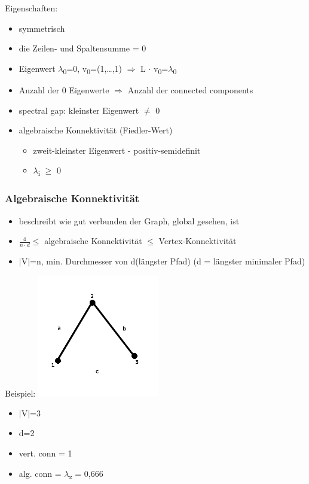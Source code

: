 Eigenschaften:
\begin{itemize}
	\item symmetrisch
	\item die Zeilen- und Spaltensumme = 0
	\item Eigenwert $\lambda$\textsubscript{0}=0, v\textsubscript{0}=(1,\ldots,1) $\Rightarrow$ L $\cdot$ v\textsubscript{0}=$\lambda$\textsubscript{0}
	\item Anzahl der 0 Eigenwerte $\Rightarrow$ Anzahl der connected components
	\item spectral gap: kleinster Eigenwert $\neq$ 0
	\item algebraische Konnektivität (Fiedler-Wert)
	\begin{itemize}
		\item zweit-kleinster Eigenwert - positiv-semidefinit
		\item $\lambda$\textsubscript{i} $\geq$ 0
	\end{itemize}
\end{itemize}

\subsubsection{Algebraische Konnektivität}
\begin{itemize}
	\item beschreibt wie gut verbunden der Graph, global gesehen, ist
	\item $\frac{4}{n \cdot d} \leq$ algebraische Konnektivität $\leq$ Vertex-Konnektivität
	\item $|$V$|$=n, min. Durchmesser von d(längster Pfad) (d = längster minimaler Pfad)
\end{itemize}

Beispiel:
\includegraphics[width=0.4\textwidth]{lectures/161028/pix/dreieck.png}\newline
\begin{itemize}
	\item $\mid$V$\mid$=3
	\item d=2
	\item vert. conn = 1
	\item alg. conn = $\lambda$\textsubscript{z} = 0,666 
\end{itemize}

